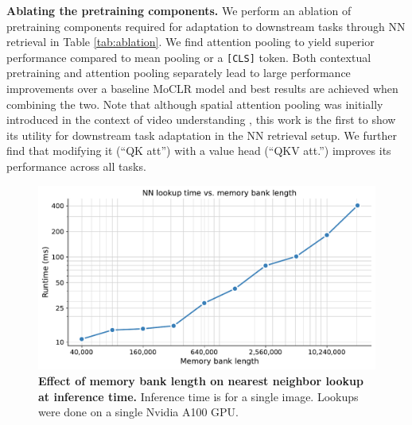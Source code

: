\documentclass{article}
\begin{document}
\textbf{Ablating the pretraining components. } We perform an ablation of pretraining components required for adaptation to downstream tasks through NN retrieval in Table \ref{tab:ablation}. We find attention pooling to yield superior performance compared to mean pooling or a \texttt{[CLS]} token. Both contextual pretraining and attention pooling separately lead to large performance improvements over a baseline MoCLR \cite{tian2021divide} model and best results are achieved when combining the two. Note that although spatial attention pooling was initially introduced in the context of video understanding \cite{parthasarathy2022self}, this work is the first to show its utility for downstream task adaptation in the NN retrieval setup. We further find that modifying it (``QK att'') with a value head (``QKV att.'') improves its performance across all tasks. 



\begin{figure}[h]
  \begin{center}
    \includegraphics[width=.65\textwidth]{figures/inference_time_vs_mem_length.pdf}
  \end{center}
\vspace{-1em}
\caption{\textbf{Effect of memory bank length on nearest neighbor lookup at inference time.} Inference time is for a single image. Lookups were done on a single Nvidia A100 GPU.}
\label{fig:memlengthruntime}
\end{figure}
\end{document}
